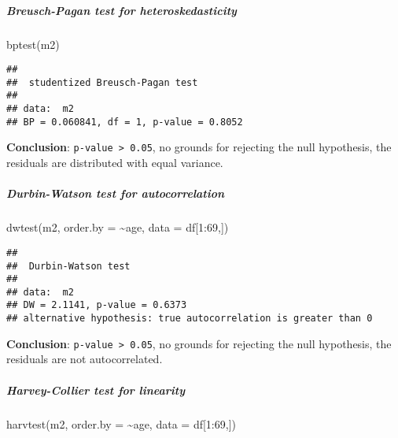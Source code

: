 \documentclass[
]{article}
\newenvironment{Shaded}{\begin{snugshade}}{\end{snugshade}}
\newcommand{\AttributeTok}[1]{\textcolor[rgb]{0.77,0.63,0.00}{#1}}
\newcommand{\DecValTok}[1]{\textcolor[rgb]{0.00,0.00,0.81}{#1}}
\newcommand{\FunctionTok}[1]{\textcolor[rgb]{0.00,0.00,0.00}{#1}}
\newcommand{\NormalTok}[1]{#1}
\newcommand{\SpecialCharTok}[1]{\textcolor[rgb]{0.00,0.00,0.00}{#1}}
\begin{document}
\hypertarget{breusch-pagan-test-for-heteroskedasticity-1}{%
\subparagraph{Breusch-Pagan test for
heteroskedasticity}\label{breusch-pagan-test-for-heteroskedasticity-1}}

\begin{Shaded}
\begin{Highlighting}[]
\FunctionTok{bptest}\NormalTok{(m2)}
\end{Highlighting}
\end{Shaded}

\begin{verbatim}
## 
##  studentized Breusch-Pagan test
## 
## data:  m2
## BP = 0.060841, df = 1, p-value = 0.8052
\end{verbatim}

\textbf{Conclusion}: \texttt{p-value\ \textgreater{}\ 0.05}, no grounds
for rejecting the null hypothesis, the residuals are distributed with
equal variance.

\hypertarget{durbin-watson-test-for-autocorrelation-1}{%
\subparagraph{Durbin-Watson test for
autocorrelation}\label{durbin-watson-test-for-autocorrelation-1}}

\begin{Shaded}
\begin{Highlighting}[]
\FunctionTok{dwtest}\NormalTok{(m2, }\AttributeTok{order.by =} \SpecialCharTok{\textasciitilde{}}\NormalTok{age, }\AttributeTok{data =}\NormalTok{ df[}\DecValTok{1}\SpecialCharTok{:}\DecValTok{69}\NormalTok{,])}
\end{Highlighting}
\end{Shaded}

\begin{verbatim}
## 
##  Durbin-Watson test
## 
## data:  m2
## DW = 2.1141, p-value = 0.6373
## alternative hypothesis: true autocorrelation is greater than 0
\end{verbatim}

\textbf{Conclusion}: \texttt{p-value\ \textgreater{}\ 0.05}, no grounds
for rejecting the null hypothesis, the residuals are not autocorrelated.

\hypertarget{harvey-collier-test-for-linearity-1}{%
\subparagraph{Harvey-Collier test for
linearity}\label{harvey-collier-test-for-linearity-1}}

\begin{Shaded}
\begin{Highlighting}[]
\FunctionTok{harvtest}\NormalTok{(m2, }\AttributeTok{order.by =} \SpecialCharTok{\textasciitilde{}}\NormalTok{age, }\AttributeTok{data =}\NormalTok{ df[}\DecValTok{1}\SpecialCharTok{:}\DecValTok{69}\NormalTok{,])}
\end{Highlighting}
\end{Shaded}
\end{document}
